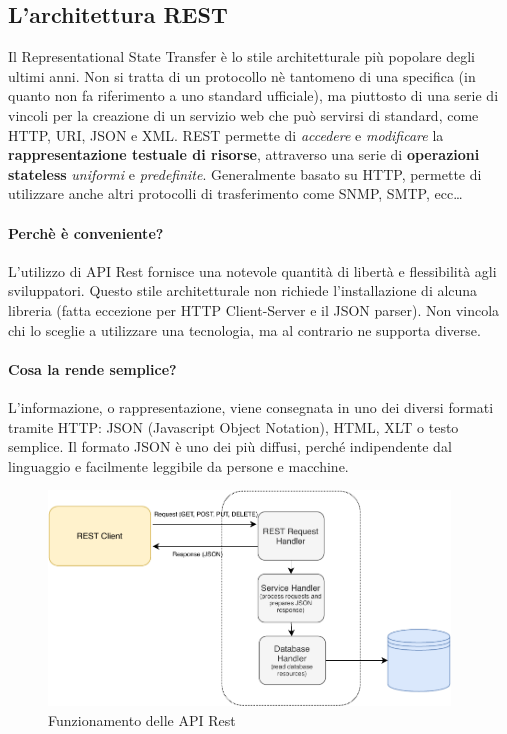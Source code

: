 \subsection{L'architettura REST}
Il Representational State Transfer è lo stile architetturale più popolare degli ultimi anni. Non si tratta di un protocollo nè tantomeno di una specifica (in quanto non fa riferimento a uno standard ufficiale), ma piuttosto di una serie di vincoli per la creazione di un servizio web che può servirsi di standard,  come HTTP, URI, JSON e XML. REST permette di \textit{accedere} e \textit{modificare} la \textbf{rappresentazione testuale di risorse}, attraverso una serie di \textbf{operazioni stateless} \textit{uniformi} e \textit{predefinite}. Generalmente basato su HTTP, permette di utilizzare anche altri protocolli di trasferimento come SNMP, SMTP, ecc\dots

\paragraph{Perchè è conveniente?} L'utilizzo di API Rest fornisce una notevole quantità di libertà e flessibilità agli sviluppatori. Questo stile architetturale non richiede l'installazione di alcuna libreria (fatta eccezione per HTTP Client-Server e il JSON parser). Non vincola  chi lo sceglie a utilizzare una tecnologia, ma al contrario ne supporta diverse.

\paragraph{Cosa la rende semplice?} L'informazione, o rappresentazione, viene consegnata in uno dei diversi formati tramite HTTP: JSON (Javascript Object Notation), HTML, XLT o testo semplice. Il formato JSON è uno dei più diffusi, perché indipendente dal linguaggio e facilmente leggibile da persone e macchine.
\begin{figure}[H]
    \centering
    \includegraphics[width=0.95\textwidth]{images/01_10_restapi.pdf}
    \caption{Funzionamento delle API Rest}
    \label{fig:api}
\end{figure}

